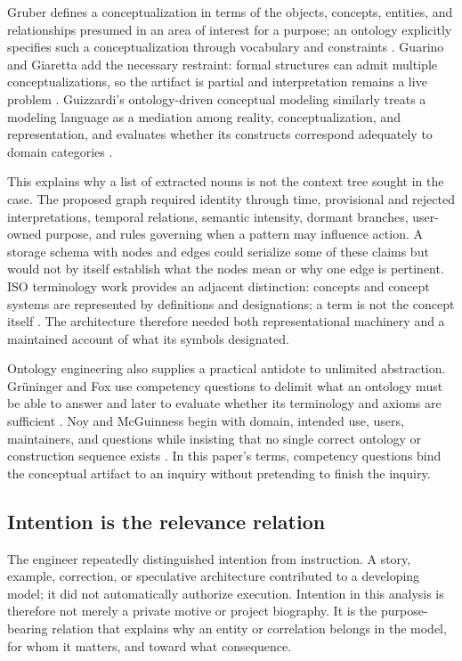 \documentclass[10pt,a4paper]{article}
\begin{document}
Gruber defines a conceptualization in terms of the objects, concepts, entities, and relationships presumed in an area of interest for a purpose; an ontology explicitly specifies such a conceptualization through vocabulary and constraints \cite{gruber1993}. Guarino and Giaretta add the necessary restraint: formal structures can admit multiple conceptualizations, so the artifact is partial and interpretation remains a live problem \cite{guarino1995}. Guizzardi's ontology-driven conceptual modeling similarly treats a modeling language as a mediation among reality, conceptualization, and representation, and evaluates whether its constructs correspond adequately to domain categories \cite{guizzardi2005}.

This explains why a list of extracted nouns is not the context tree sought in the case. The proposed graph required identity through time, provisional and rejected interpretations, temporal relations, semantic intensity, dormant branches, user-owned purpose, and rules governing when a pattern may influence action. A storage schema with nodes and edges could serialize some of these claims but would not by itself establish what the nodes mean or why one edge is pertinent. ISO terminology work provides an adjacent distinction: concepts and concept systems are represented by definitions and designations; a term is not the concept itself \cite{iso704}. The architecture therefore needed both representational machinery and a maintained account of what its symbols designated.

Ontology engineering also supplies a practical antidote to unlimited abstraction. Gr\"uninger and Fox use competency questions to delimit what an ontology must be able to answer and later to evaluate whether its terminology and axioms are sufficient \cite{gruninger1995}. Noy and McGuinness begin with domain, intended use, users, maintainers, and questions while insisting that no single correct ontology or construction sequence exists \cite{noy2001}. In this paper's terms, competency questions bind the conceptual artifact to an inquiry without pretending to finish the inquiry.

\subsection{Intention is the relevance relation}

The engineer repeatedly distinguished intention from instruction. A story, example, correction, or speculative architecture contributed to a developing model; it did not automatically authorize execution. Intention in this analysis is therefore not merely a private motive or project biography. It is the purpose-bearing relation that explains why an entity or correlation belongs in the model, for whom it matters, and toward what consequence.
\end{document}
